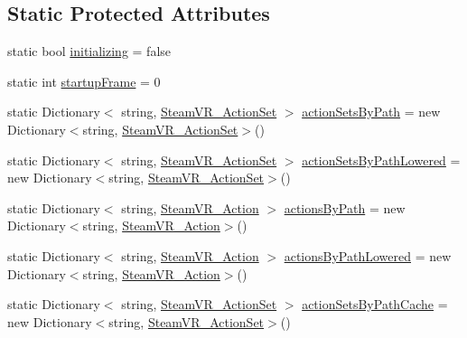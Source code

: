 \subsection*{Static Protected Attributes}
\begin{DoxyCompactItemize}
\item 
static bool \mbox{\hyperlink{class_valve_1_1_v_r_1_1_steam_v_r___input_a6fe24069d4c06479c3e9ee90dd26334e}{initializing}} = false
\item 
static int \mbox{\hyperlink{class_valve_1_1_v_r_1_1_steam_v_r___input_ae054a21282786691c33b1cc1354c4cda}{startup\+Frame}} = 0
\item 
static Dictionary$<$ string, \mbox{\hyperlink{class_valve_1_1_v_r_1_1_steam_v_r___action_set}{Steam\+V\+R\+\_\+\+Action\+Set}} $>$ \mbox{\hyperlink{class_valve_1_1_v_r_1_1_steam_v_r___input_acfb4f250bcffea97de00849dc65b00f2}{action\+Sets\+By\+Path}} = new Dictionary$<$string, \mbox{\hyperlink{class_valve_1_1_v_r_1_1_steam_v_r___action_set}{Steam\+V\+R\+\_\+\+Action\+Set}}$>$()
\item 
static Dictionary$<$ string, \mbox{\hyperlink{class_valve_1_1_v_r_1_1_steam_v_r___action_set}{Steam\+V\+R\+\_\+\+Action\+Set}} $>$ \mbox{\hyperlink{class_valve_1_1_v_r_1_1_steam_v_r___input_a7e426703cdad469de33294378460572a}{action\+Sets\+By\+Path\+Lowered}} = new Dictionary$<$string, \mbox{\hyperlink{class_valve_1_1_v_r_1_1_steam_v_r___action_set}{Steam\+V\+R\+\_\+\+Action\+Set}}$>$()
\item 
static Dictionary$<$ string, \mbox{\hyperlink{class_valve_1_1_v_r_1_1_steam_v_r___action}{Steam\+V\+R\+\_\+\+Action}} $>$ \mbox{\hyperlink{class_valve_1_1_v_r_1_1_steam_v_r___input_a01fc292d2f7dc293fa90804aad062888}{actions\+By\+Path}} = new Dictionary$<$string, \mbox{\hyperlink{class_valve_1_1_v_r_1_1_steam_v_r___action}{Steam\+V\+R\+\_\+\+Action}}$>$()
\item 
static Dictionary$<$ string, \mbox{\hyperlink{class_valve_1_1_v_r_1_1_steam_v_r___action}{Steam\+V\+R\+\_\+\+Action}} $>$ \mbox{\hyperlink{class_valve_1_1_v_r_1_1_steam_v_r___input_add287ffec4527232bc96e7282a04825c}{actions\+By\+Path\+Lowered}} = new Dictionary$<$string, \mbox{\hyperlink{class_valve_1_1_v_r_1_1_steam_v_r___action}{Steam\+V\+R\+\_\+\+Action}}$>$()
\item 
static Dictionary$<$ string, \mbox{\hyperlink{class_valve_1_1_v_r_1_1_steam_v_r___action_set}{Steam\+V\+R\+\_\+\+Action\+Set}} $>$ \mbox{\hyperlink{class_valve_1_1_v_r_1_1_steam_v_r___input_a319debe0fd717b52106c4006efb69f3d}{action\+Sets\+By\+Path\+Cache}} = new Dictionary$<$string, \mbox{\hyperlink{class_valve_1_1_v_r_1_1_steam_v_r___action_set}{Steam\+V\+R\+\_\+\+Action\+Set}}$>$()

\end{DoxyCompactItemize}
